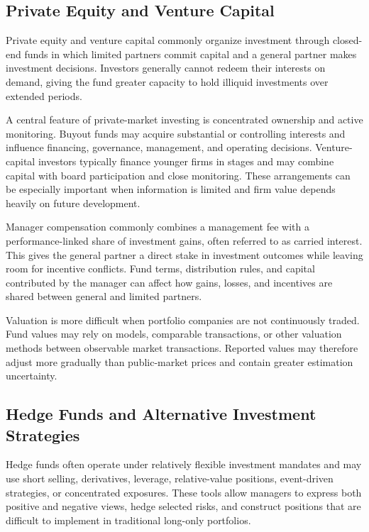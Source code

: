 \subsection{Private Equity and Venture Capital}

Private equity and venture capital commonly organize investment through closed-end funds in which limited partners commit capital and a general partner makes investment decisions. Investors generally cannot redeem their interests on demand, giving the fund greater capacity to hold illiquid investments over extended periods.

A central feature of private-market investing is concentrated ownership and active monitoring. Buyout funds may acquire substantial or controlling interests and influence financing, governance, management, and operating decisions. Venture-capital investors typically finance younger firms in stages and may combine capital with board participation and close monitoring. These arrangements can be especially important when information is limited and firm value depends heavily on future development.

Manager compensation commonly combines a management fee with a performance-linked share of investment gains, often referred to as carried interest. This gives the general partner a direct stake in investment outcomes while leaving room for incentive conflicts. Fund terms, distribution rules, and capital contributed by the manager can affect how gains, losses, and incentives are shared between general and limited partners.

Valuation is more difficult when portfolio companies are not continuously traded. Fund values may rely on models, comparable transactions, or other valuation methods between observable market transactions. Reported values may therefore adjust more gradually than public-market prices and contain greater estimation uncertainty.

\subsection{Hedge Funds and Alternative Investment Strategies}

Hedge funds often operate under relatively flexible investment mandates and may use short selling, derivatives, leverage, relative-value positions, event-driven strategies, or concentrated exposures. These tools allow managers to express both positive and negative views, hedge selected risks, and construct positions that are difficult to implement in traditional long-only portfolios.

